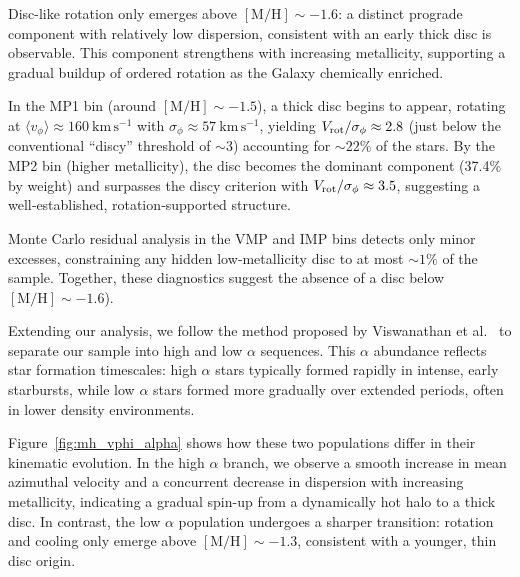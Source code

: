 \documentclass[a4paper,10pt]{article}
\begin{document}
\begin{multicols}{2}
Disc-like rotation only emerges above $\mathrm{[M/H]} \sim -1.6$: a distinct prograde component with 
relatively low dispersion, consistent with an early thick disc is observable. 
This component strengthens with increasing metallicity, supporting a gradual buildup of 
ordered rotation as the Galaxy chemically enriched.


In the MP1 bin (around $\mathrm{[M/H]}\sim-1.5$), a thick disc begins to appear, 
rotating at $\langle v_{\phi}\rangle \approx160\ \mathrm{km\,s^{-1}}$ with $\sigma_{\phi}\approx57\ \mathrm{km\,s^{-1}}$, 
yielding $V_{\rm rot}/\sigma_{\phi}\approx2.8$ (just below the conventional “discy” threshold of $\sim3$) accounting for $\sim22\%$ of the stars. 
By the MP2 bin (higher metallicity), the disc becomes the dominant component (37.4\% by weight) and surpasses the discy criterion with 
$V_{\rm rot}/\sigma_{\phi}\approx3.5$, suggesting a well‐established, rotation‐supported structure. 

Monte Carlo residual analysis in the VMP and IMP bins detects only minor excesses, 
constraining any hidden low‐metallicity disc to at most $\sim1\%$ of the sample. Together, these diagnostics suggest the 
absence of a disc below $\mathrm{[M/H]}\sim-1.6$).  


Extending our analysis, we follow the method proposed by Viswanathan et al.~\cite{Vis2024} to separate our sample into 
high and low $\alpha$ sequences. This $\alpha$ abundance reflects star formation timescales: high $\alpha$ 
stars typically formed rapidly in intense, early starbursts, while low $\alpha$ stars 
formed more gradually over extended periods, often in lower density environments.

Figure~\ref{fig:mh_vphi_alpha} shows how these two populations differ in their kinematic evolution. 
In the high $\alpha$ branch, we observe a smooth increase in mean azimuthal velocity and a concurrent 
decrease in dispersion with increasing metallicity, indicating a gradual spin-up from a dynamically hot 
halo to a thick disc. In contrast, the low $\alpha$ population undergoes a sharper transition: 
rotation and cooling only emerge above $\mathrm{[M/H]} \sim -1.3$, consistent with a younger, thin disc origin.


\end{multicols}
\end{document}
